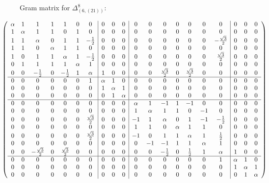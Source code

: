 \documentclass{article}
\theoremstyle{definition}
\newcommand{\Deltaa}{\Delta}   %
\newcommand{\Deltaaa}[2]{\Deltaa^{#1}_{#2}}
\numberwithin{equation}{subsection}
\begin{document}
{Gram matrix for $\Deltaaa{8}{(6,(21))}$:

\[ \hspace{-1cm} 
\left(
\begin{array}{ccccccc|ccc|ccccccc|ccc}
 \alpha  & 1 & 1 & 1 & 1 & 0 & 0 & 0 & 0 & 0 & 0 & 0 & 0 & 0 & 0 & 0 & 0 & 0 & 0 & 0 \\
 1 & \alpha  & 1 & 1 & 0 & 1 & 0 & 0 & 0 & 0 & 0 & 0 & 0 & 0 & 0 & 0 & 0 & 0 & 0 & 0 \\
 1 & 1 & \alpha  & 0 & 1 & 1 & -\frac{1}{2} & 0 & 0 & 0 & 0 & 0 & 0 & 0 & 0 & 0 & -\frac{\sqrt{3}}{2} & 0 & 0 & 0 \\
 1 & 1 & 0 & \alpha  & 1 & 1 & 0 & 0 & 0 & 0 & 0 & 0 & 0 & 0 & 0 & 0 & 0 & 0 & 0 & 0 \\
 1 & 0 & 1 & 1 & \alpha  & 1 & -\frac{1}{2} & 0 & 0 & 0 & 0 & 0 & 0 & 0 & 0 & 0 & \frac{\sqrt{3}}{2} & 0 & 0 & 0 \\
 0 & 1 & 1 & 1 & 1 & \alpha  & 1 & 0 & 0 & 0 & 0 & 0 & 0 & 0 & 0 & 0 & 0 & 0 & 0 & 0 \\
 0 & 0 & -\frac{1}{2} & 0 & -\frac{1}{2} & 1 & \alpha  & 1 & 0 & 0 & 0 & 0 & \frac{\sqrt{3}}{2} & 0 & \frac{\sqrt{3}}{2} & 0 & 0 & 0 & 0 & 0 
 \\  \hline  
 0 & 0 & 0 & 0 & 0 & 0 & 1 & \alpha  & 1 & 0 & 0 & 0 & 0 & 0 & 0 & 0 & 0 & 0 & 0 & 0 
 \\
 0 & 0 & 0 & 0 & 0 & 0 & 0 & 1 & \alpha  & 1 & 0 & 0 & 0 & 0 & 0 & 0 & 0 & 0 & 0 & 0 
 \\
 0 & 0 & 0 & 0 & 0 & 0 & 0 & 0 & 1 & \alpha  & 0 & 0 & 0 & 0 & 0 & 0 & 0 & 0 & 0 & 0 
 \\  \hline 
 0 & 0 & 0 & 0 & 0 & 0 & 0 & 0 & 0 & 0 & \alpha  & 1 & -1 & 1 & -1 & 0 & 0 & 0 & 0 & 0 \\
 0 & 0 & 0 & 0 & 0 & 0 & 0 & 0 & 0 & 0 & 1 & \alpha  & 1 & 1 & 0 & -1 & 0 & 0 & 0 & 0 \\
 0 & 0 & 0 & 0 & 0 & 0 & \frac{\sqrt{3}}{2} & 0 & 0 & 0 & -1 & 1 & \alpha  & 0 & 1 & -1 & -\frac{1}{2} & 0 & 0 & 0 \\
 0 & 0 & 0 & 0 & 0 & 0 & 0 & 0 & 0 & 0 & 1 & 1 & 0 & \alpha  & 1 & 1 & 0 & 0 & 0 & 0 \\
 0 & 0 & 0 & 0 & 0 & 0 & \frac{\sqrt{3}}{2} & 0 & 0 & 0 & -1 & 0 & 1 & 1 & \alpha  & 1 & \frac{1}{2} & 0 & 0 & 0 \\
 0 & 0 & 0 & 0 & 0 & 0 & 0 & 0 & 0 & 0 & 0 & -1 & -1 & 1 & 1 & \alpha  & 1 & 0 & 0 & 0 \\
 0 & 0 & -\frac{\sqrt{3}}{2} & 0 & \frac{\sqrt{3}}{2} & 0 & 0 & 0 & 0 & 0 & 0 & 0 & -\frac{1}{2} & 0 & \frac{1}{2} & 1 & \alpha  & 1 & 0 & 0 
 \\ \hline 
 0 & 0 & 0 & 0 & 0 & 0 & 0 & 0 & 0 & 0 & 0 & 0 & 0 & 0 & 0 & 0 & 1 & \alpha  & 1 & 0 \\
 0 & 0 & 0 & 0 & 0 & 0 & 0 & 0 & 0 & 0 & 0 & 0 & 0 & 0 & 0 & 0 & 0 & 1 & \alpha  & 1 \\
 0 & 0 & 0 & 0 & 0 & 0 & 0 & 0 & 0 & 0 & 0 & 0 & 0 & 0 & 0 & 0 & 0 & 0 & 1 & \alpha  \\
\end{array}
\right)
\]


}
\end{document}
